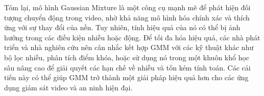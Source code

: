 \documentclass[a4paper]{article}
\begin{document}
Tóm lại, mô hình Gaussian Mixture là một công cụ mạnh mẽ để phát hiện đối tượng chuyển động trong video, nhờ khả năng mô hình hóa chính xác và thích ứng với sự thay đổi của nền. Tuy nhiên, tính hiệu quả của nó có thể bị ảnh hưởng trong các điều kiện nhiễu hoặc động. Để tối đa hóa hiệu quả, các nhà phát triển và nhà nghiên cứu nên cân nhắc kết hợp GMM với các kỹ thuật khác như bộ lọc nhiễu, phân tích điểm khóa, hoặc sử dụng nó trong một khuôn khổ học sâu nâng cao để giải quyết các hạn chế về nhiễu và tốn kém tính toán. Các cải tiến này có thể giúp GMM trở thành một giải pháp hiệu quả hơn cho các ứng dụng giám sát video và an ninh hiện đại.


\newpage
\renewcommand*{\bibfont}{\small}
\printbibliography
\end{document}
